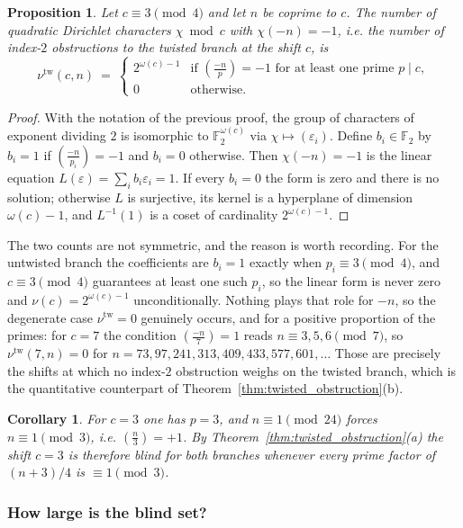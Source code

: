 \documentclass[11pt, a4paper]{article}
\theoremstyle{plain}
\newtheorem{corollary}[theorem]{Corollary}
\newtheorem{proposition}[theorem]{Proposition}
\theoremstyle{definition}
\newcommand{\leg}[2]{\left(\frac{#1}{#2}\right)}
\begin{document}
\begin{proposition}\label{prop:nu_tw}
Let $c\equiv3\pmod4$ and let $n$ be coprime to $c$. The number of quadratic Dirichlet characters $\chi\bmod c$ with $\chi(-n)=-1$, i.e. the number of index-$2$ obstructions to the twisted branch at the shift $c$, is
$$\nu^{\mathrm{tw}}(c,n)\ =\ \begin{cases}2^{\omega(c)-1} & \text{if } \leg{-n}{p}=-1 \text{ for at least one prime } p\mid c,\\[4pt] 0 & \text{otherwise.}\end{cases}$$
\end{proposition}
\begin{proof}
With the notation of the previous proof, the group of characters of exponent dividing $2$ is isomorphic to $\mathbb{F}_2^{\omega(c)}$ via $\chi\mapsto(\varepsilon_i)$. Define $b_i\in\mathbb{F}_2$ by $b_i=1$ if $\leg{-n}{p_i}=-1$ and $b_i=0$ otherwise. Then $\chi(-n)=-1$ is the linear equation $L(\varepsilon)=\sum_i b_i\varepsilon_i=1$. If every $b_i=0$ the form is zero and there is no solution; otherwise $L$ is surjective, its kernel is a hyperplane of dimension $\omega(c)-1$, and $L^{-1}(1)$ is a coset of cardinality $2^{\omega(c)-1}$.
\end{proof}

The two counts are not symmetric, and the reason is worth recording. For the untwisted branch the coefficients are $b_i=1$ exactly when $p_i\equiv3\pmod4$, and $c\equiv3\pmod4$ guarantees at least one such $p_i$, so the linear form is never zero and $\nu(c)=2^{\omega(c)-1}$ unconditionally. Nothing plays that role for $-n$, so the degenerate case $\nu^{\mathrm{tw}}=0$ genuinely occurs, and for a positive proportion of the primes: for $c=7$ the condition $\leg{-n}7=1$ reads $n\equiv3,5,6\pmod7$, so $\nu^{\mathrm{tw}}(7,n)=0$ for $n=73,97,241,313,409,433,577,601,\ldots$ Those are precisely the shifts at which no index-$2$ obstruction weighs on the twisted branch, which is the quantitative counterpart of Theorem~\ref{thm:twisted_obstruction}(b).

\begin{corollary}\label{cor:shift3}
For $c=3$ one has $p=3$, and $n\equiv1\pmod{24}$ forces $n\equiv1\pmod3$, i.e. $\leg n3=+1$. By Theorem~\ref{thm:twisted_obstruction}(a) the shift $c=3$ is therefore blind for both branches whenever every prime factor of $(n+3)/4$ is $\equiv1\pmod3$.
\end{corollary}

\subsubsection{How large is the blind set?} \label{sec:5.1.2}
\end{document}
